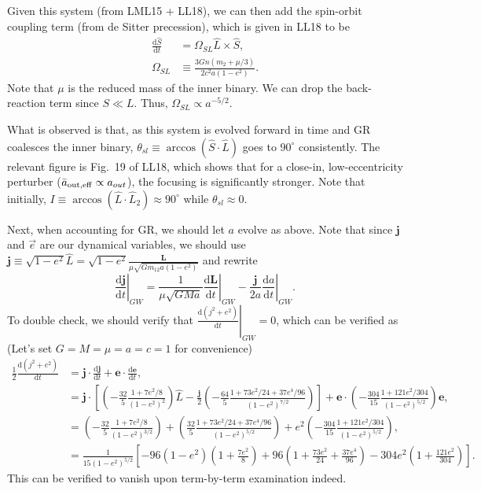\documentclass[11pt,
        usenames, %
        dvipsnames %
    ]{article}
\newcommand*{\rd}[2]{\frac{\mathrm{d}#1}{\mathrm{d}#2}}
\newcommand*{\bm}[1]{\boldsymbol{\mathbf{#1}}}
\newcommand*{\at}[1]{\left.#1\right|}
\newcommand*{\p}[1]{\left(#1\right)}
\newcommand*{\s}[1]{\left[#1\right]}
\begin{document}
Given this system (from LML15 + LL18), we can then add the spin-orbit coupling
term (from de Sitter precession), which is given in LL18 to be
\begin{align}
    \rd{\hat{S}}{t} &= \Omega_{SL}\hat{L} \times \hat{S},\\
    \Omega_{SL} &\equiv \frac{3Gn\p{m_2 + \mu/3}}{2c^2a\p{1 - e^2}}.
\end{align}
Note that $\mu$ is the reduced mass of the inner binary. We can drop the
back-reaction term since $S \ll L$. Thus, $\Omega_{SL} \propto a^{-5/2}$.

What is observed is that, as this system is evolved forward in time and GR
coalesces the inner binary, $\theta_{sl} \equiv \arccos\p{\hat{S} \cdot
\hat{L}}$ goes to $90^\circ$ consistently. The relevant figure is Fig.~19 of
LL18, which shows that for a close-in, low-eccentricity perturber ($\bar{a}_{\rm
out, eff} \propto a_{out}$), the focusing is significantly stronger. Note that
initially, $I \equiv \arccos\p{\hat{L} \cdot \hat{L}_2} \approx 90^\circ$ while
$\theta_{sl} \approx 0$.

Next, when accounting for GR, we should let $a$ evolve as above. Note that since
$\bm{j}$ and $\vec{e}$ are our dynamical variables, we should use $\bm{j} \equiv
\sqrt{1 - e^2} \hat{L} = \sqrt{1 - e^2}\frac{\bm{L}}{\mu \sqrt{Gm_{12}a\p{1 -
e^2}}}$ and rewrite
\begin{equation}
    \at{\rd{\bm{j}}{t}}_{GW} = \frac{1}{\mu\sqrt{GMa}}\at{\rd{\bm{L}}{t}}_{GW}
        - \frac{\bm{j}}{2a}\at{\rd{a}{t}}_{GW}.
\end{equation}
To double check, we should verify that $\at{\rd{(j^2 + e^2)}{t}}_{GW} = 0$,
which can be verified as (Let's set $G = M = \mu = a = c = 1$ for convenience)
\begin{align}
    \frac{1}{2}\rd{(j^2 + e^2)}{t}
        &= \bm{j} \cdot \rd{\bm{j}}{t} + \bm{e} \cdot \rd{\bm{e}}{t},\\
        &= \bm{j} \cdot \s{
            \p{-\frac{32}{5}\frac{1 + 7e^2/8}{\p{1 - e^2}^2}}\hat{L}
                - \frac{\bm{j}}{2}\p{-\frac{64}{5}
                    \frac{1 + 73e^2/24 + 37e^4/96}{\p{1 - e^2}^{7/2}}}}
            + \bm{e} \cdot
                \p{-\frac{304}{15}\frac{1 + 121e^2/304}{\p{1 - e^2}^{5/2}}}
                \bm{e},\\
        &= \p{-\frac{32}{5}\frac{1 + 7e^2/8}{\p{1 - e^2}^{3/2}}}
                + \p{\frac{32}{5}
                    \frac{1 + 73e^2/24 + 37e^4/96}{\p{1 - e^2}^{5/2}}}
            + e^2 \p{-\frac{304}{15}\frac{1 + 121e^2/304}{\p{1 - e^2}^{5/2}}}
                ,\\
        &= \frac{1}{15\p{1 - e^2}^{5/2}}\s{
            -96\p{1 - e^2}\p{1 + \frac{7e^2}{8}}
                + 96\p{1 + \frac{73e^2}{24} + \frac{37e^4}{96}}
                - 304e^2\p{1 + \frac{121e^2}{304}}}.
\end{align}
This can be verified to vanish upon term-by-term examination indeed.
\end{document}
